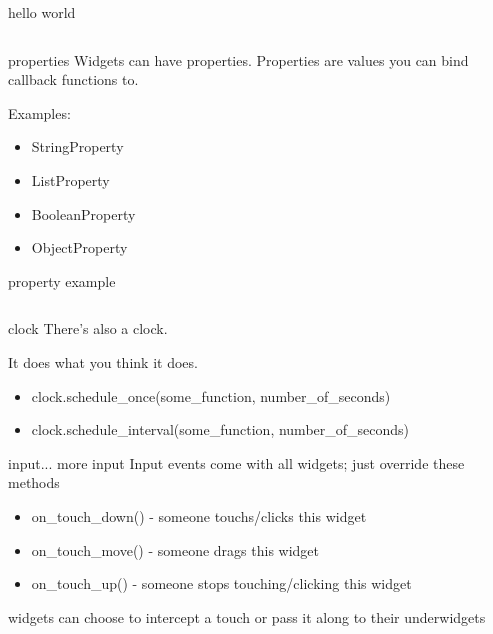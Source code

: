 \documentclass{beamer}
\begin{document}
\begin{frame}[fragile]{hello world}
  \inputminted{python}{helloworld.py}
\end{frame}


\begin{frame}{properties}
  Widgets can have properties. Properties are values you can bind callback functions to.
  \pause

  Examples:
    \begin{itemize}
    \item StringProperty
    \pause
    \item ListProperty
    \pause
    \item BooleanProperty
    \pause
    \item ObjectProperty
    \end{itemize}
\end{frame}


\begin{frame}[fragile]{property example}
  \inputminted{python}{property_example.py}
\end{frame}




\begin{frame}{clock}
There's also a clock.
\pause

It does what you think it does.

\pause
\begin{itemize}
  \item clock.schedule\_once(some\_function, number\_of\_seconds)
  \pause
  \item clock.schedule\_interval(some\_function, number\_of\_seconds)
  \pause
\end{itemize}
\end{frame}


\begin{frame}{input... more input}
  Input events come with all widgets; just override these methods

  \pause
  \begin{itemize}
  \item on\_touch\_down()  - someone touchs/clicks this widget
  \pause
  \item on\_touch\_move()  - someone drags this widget
  \pause
  \item on\_touch\_up()    - someone stops touching/clicking this widget
  \pause
\end{itemize}
widgets can choose to intercept a touch or pass it along to their underwidgets
\end{frame}
\end{document}
